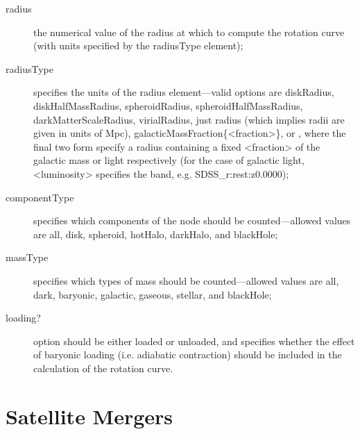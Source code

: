\begin{description}
 \item [{\normalfont \ttfamily radius}] the numerical value of the radius at which to compute the rotation curve (with units specified by the {\normalfont \ttfamily radiusType} element);
 \item [{\normalfont \ttfamily radiusType}] specifies the units of the {\normalfont \ttfamily radius} element---valid options are {\normalfont \ttfamily diskRadius}, {\normalfont \ttfamily diskHalfMassRadius}, {\normalfont \ttfamily spheroidRadius}, {\normalfont \ttfamily spheroidHalfMassRadius}, {\normalfont \ttfamily darkMatterScaleRadius}, {\normalfont \ttfamily virialRadius}, just {\normalfont \ttfamily radius} (which implies radii are given in units of Mpc), {\normalfont \ttfamily galacticMassFraction\{\textless fraction\textgreater\}}, or , where the final two form specify a radius containing a fixed {\normalfont \ttfamily \textless fraction\textgreater} of the galactic mass or light respectively (for the case of galactic light, {\normalfont \ttfamily \textless luminosity\textgreater} specifies the band, e.g. {\normalfont \ttfamily SDSS\_r:rest:z0.0000});
 \item [{\normalfont \ttfamily componentType}] specifies which components of the node should be counted---allowed values are {\normalfont \ttfamily all}, {\normalfont \ttfamily disk}, {\normalfont \ttfamily spheroid}, {\normalfont \ttfamily hotHalo}, {\normalfont \ttfamily darkHalo}, and {\normalfont \ttfamily blackHole};
 \item [{\normalfont \ttfamily massType}] specifies which types of mass should be counted---allowed values are {\normalfont \ttfamily all}, {\normalfont \ttfamily dark}, {\normalfont \ttfamily baryonic}, {\normalfont \ttfamily galactic}, {\normalfont \ttfamily gaseous}, {\normalfont \ttfamily stellar}, and {\normalfont \ttfamily blackHole};
 \item [{\normalfont \ttfamily loading?}] option should be either {\normalfont \ttfamily loaded} or {\normalfont \ttfamily unloaded}, and specifies whether the effect of baryonic loading (i.e. adiabatic contraction) should be included in the calculation of the rotation curve.
\end{description}

\section{Satellite Mergers}

